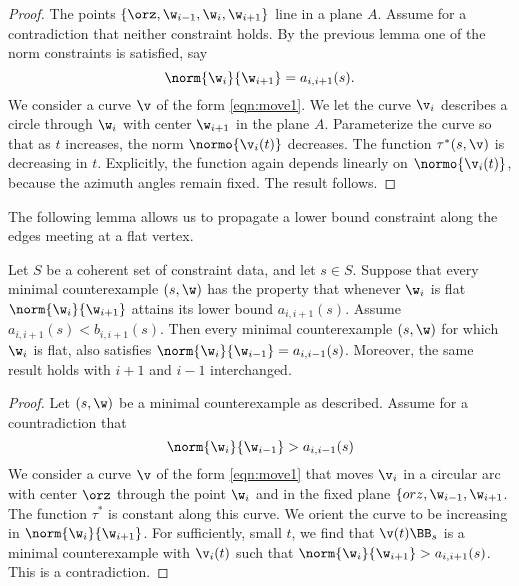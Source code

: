 \begin{proof}  The points $\{\orz,\w_{i-1},\w_i,\w_{i+1}\}$ line in a plane $A$.
Assume for a contradiction that neither constraint holds.  By the previous
lemma one of the norm constraints is satisfied, say
\[
\norm{\w_i}{\w_{i+1}}=a_{i,i+1}(s).
\]
We consider a  curve $\v$ of the form \eqref{eqn:move1}.
We let the curve $\v_i$ describes a circle through
 $\w_i$ with center $\w_{i+1}$ in the plane $A$.  Parameterize the curve
so that as $t$ increases, the norm $\normo{\v_i(t)}$ decreases.
The function $\tau^*(s,\v)$ is decreasing in $t$.  Explicitly, the
function again depends linearly on $\normo{\v_i(t)}$, because
the azimuth angles remain fixed.  The result follows.
\end{proof}

The following lemma allows us to propagate a lower bound constraint
along the edges meeting at a flat vertex.

\begin{lemma} 
Let $S$ be a coherent set of constraint data, and let $s\in S$.
Suppose that every minimal counterexample $(s,\w)$ has the
property that whenever $\w_i$ is flat $\norm{\w_i}{\w_{i+1}}$ attains its
lower bound $a_{i,i+1}(s)$.   Assume $a_{i,i+1}(s)<b_{i,i+1}(s)$.
Then every minimal counterexample $(s,\w)$
for which $\w_i$ is flat, also satisfies $\norm{\w_i}{\w_{i-1}}=a_{i,i-1}(s)$.
Moreover, the same result holds with $i+1$ and $i-1$ interchanged.
\end{lemma}

\begin{proof}
Let $(s,\w)$ be a minimal counterexample as described.
Assume for a countradiction that 
\[
\norm{\w_i}{\w_{i-1}}>a_{i,i-1}(s)
\]
We consider a curve $\v$ of the form \eqref{eqn:move1} that moves $\v_i$
in a circular arc with center $\orz$ through the point $\w_i$ and in
the fixed plane $\{orz,\w_{i-1},\w_{i+1}$.  The function $\tau^*$ is
constant along this curve.  We orient the curve to be increasing
in $\norm{\w_i}{\w_{i+1}}$.  For sufficiently, small $t$, we find that
$\v(t)\BB_s$ is a minimal counterexample with $\v_i(t)$ such that
$\norm{\w_i}{\w_{i+1}} > a_{i,i+1}(s)$. This is a contradiction.
\end{proof}

